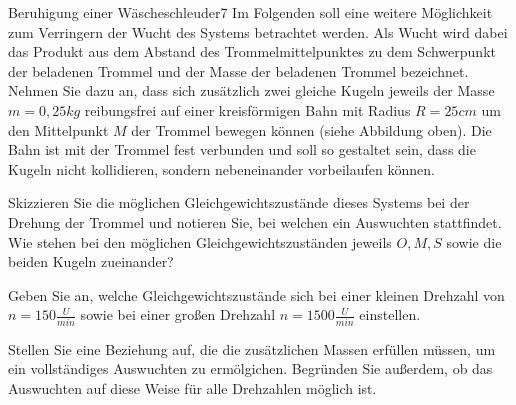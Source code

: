 \begin{problem}{Beruhigung einer Wäscheschleuder}{7}
Im Folgenden soll eine weitere Möglichkeit zum Verringern der Wucht des Systems betrachtet werden.  Als Wucht wird dabei das Produkt aus dem Abstand des Trommelmittelpunktes zu dem Schwerpunkt der beladenen Trommel und der Masse der beladenen Trommel bezeichnet.  Nehmen Sie dazu an, dass sich zusätzlich zwei gleiche Kugeln jeweils der Masse $m=0,25\unit{kg}$ reibungsfrei auf einer kreisförmigen Bahn mit Radius $R=25\unit{cm}$ um den Mittelpunkt $M$ der Trommel bewegen können (siehe Abbildung oben). Die Bahn ist mit der Trommel fest verbunden und soll so gestaltet sein, dass die Kugeln nicht kollidieren, sondern nebeneinander vorbeilaufen können.

\begin{abcenum}
  \item Skizzieren Sie die möglichen Gleichgewichtszustände dieses Systems bei der Drehung der Trommel und notieren Sie, bei welchen ein Auswuchten stattfindet.  Wie stehen bei den möglichen Gleichgewichtszuständen jeweils $O, M, S$ sowie die beiden Kugeln zueinander?
  \item Geben Sie an, welche Gleichgewichtszustände sich bei einer kleinen Drehzahl von $n=150\unit{\frac{U}{min}}$ sowie bei einer großen Drehzahl $n=1500\unit{\frac{U}{min}}$ einstellen.
  \item Stellen Sie eine Beziehung auf, die die zusätzlichen Massen erfüllen müssen, um ein vollständiges Auswuchten zu ermölgichen.  Begründen Sie außerdem, ob das Auswuchten auf diese Weise für alle Drehzahlen möglich ist.
\end{abcenum}

\end{problem}




